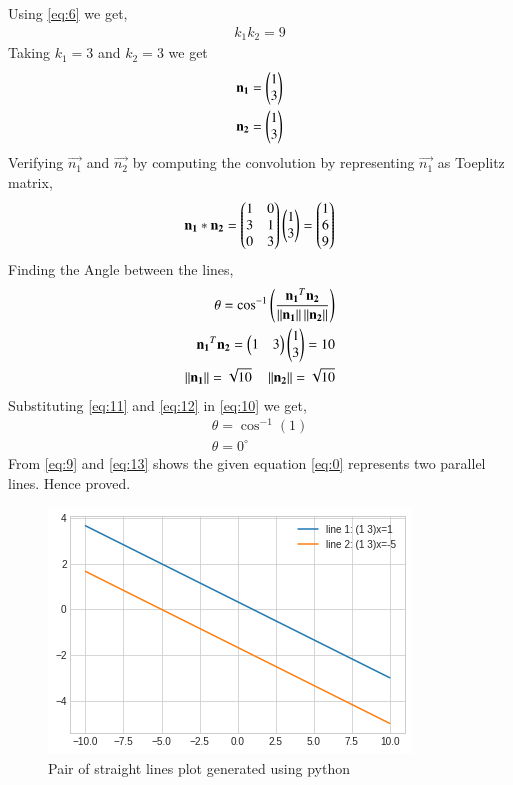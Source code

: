 \documentclass[journal,12pt,twocolumn]{IEEEtran}
\begin{document}
Using \eqref{eq:6} we get,
\begin{align}
k_1k_2 = 9
\end{align}
Taking $k_1=3$ and $k_2 = 3$ we get
\begin{align}
\mathbf{n_1}=\begin{pmatrix}1\\3\end{pmatrix}\\
\mathbf{n_2}=\begin{pmatrix}1\\3\end{pmatrix}
\end{align}
Verifying $\vec{n_1}$ and $\vec{n_2}$ by computing the convolution by representing $\vec{n_1}$ as Toeplitz matrix,
\begin{align}
\mathbf{n_1}*\mathbf{n_2}=\begin{pmatrix}1&0\\3&1\\0&3\end{pmatrix}\begin{pmatrix}1\\3\end{pmatrix}=\begin{pmatrix}1\\6\\9\end{pmatrix}
\end{align}
Finding the Angle between the lines,
\begin{align}
\theta = \cos^{-1}\left(\frac{\mathbf{n_1}^T\mathbf{n_2}}{\left\lVert\mathbf{n_1}\right\rVert\left\lVert\mathbf{n_2}\right\rVert}\right)\\
\mathbf{n_1}^T\mathbf{n_2} = \begin{pmatrix}1&3\end{pmatrix}\begin{pmatrix}1\\3\end{pmatrix} = 10 \label{eq:11}\\
\left\lVert\mathbf{n_1}\right\rVert = \sqrt{10}\quad \left\lVert\mathbf{n_2}\right\rVert=\sqrt{10} \label{eq:12}
\end{align}
Substituting \eqref{eq:11} and \eqref{eq:12} in \eqref{eq:10} we get,
\begin{align}
\theta = \cos^{-1}(1)\\
\theta = 0^{\circ}\label{eq:13}
\end{align}
From \eqref{eq:9} and \eqref{eq:13} shows the given equation \eqref{eq:0} represents two parallel lines. Hence proved.
\begin{figure}[!ht]
\centering
\includegraphics[width=\columnwidth]{Straight_lines.png}
\caption{Pair of straight lines plot generated using python}
\label{fig:plot}
\end{figure}
\end{document}

